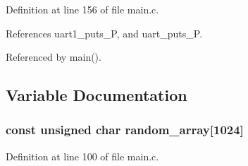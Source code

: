 Definition at line 156 of file main.c.

References uart1\_\-puts\_\-P, and uart\_\-puts\_\-P.

Referenced by main().

\subsection{Variable Documentation}
\subsubsection{\setlength{\rightskip}{0pt plus 5cm}const unsigned char {\bf random\_\-array}[1024]}\label{main_8c_3d904f51c6332f2482f0383ac9c918e6}




Definition at line 100 of file main.c.